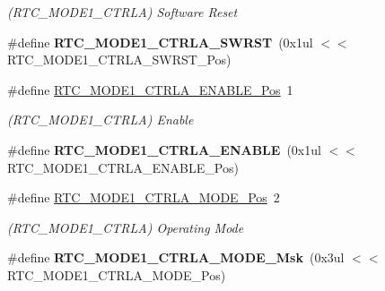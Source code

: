 \begin{DoxyCompactItemize}
\begin{DoxyCompactList}\small\item\em (R\+T\+C\+\_\+\+M\+O\+D\+E1\+\_\+\+C\+T\+R\+L\+A) Software Reset \end{DoxyCompactList}\item 
\hypertarget{group___s_a_m_l21___r_t_c_gaca206484e5f9a1691a4ce95b6c845637}{}\#define {\bfseries R\+T\+C\+\_\+\+M\+O\+D\+E1\+\_\+\+C\+T\+R\+L\+A\+\_\+\+S\+W\+R\+S\+T}~(0x1ul $<$$<$ R\+T\+C\+\_\+\+M\+O\+D\+E1\+\_\+\+C\+T\+R\+L\+A\+\_\+\+S\+W\+R\+S\+T\+\_\+\+Pos)\label{group___s_a_m_l21___r_t_c_gaca206484e5f9a1691a4ce95b6c845637}

\item 
\hypertarget{group___s_a_m_l21___r_t_c_ga93ed832f2b29bae0083eaed5b032584d}{}\#define \hyperlink{group___s_a_m_l21___r_t_c_ga93ed832f2b29bae0083eaed5b032584d}{R\+T\+C\+\_\+\+M\+O\+D\+E1\+\_\+\+C\+T\+R\+L\+A\+\_\+\+E\+N\+A\+B\+L\+E\+\_\+\+Pos}~1\label{group___s_a_m_l21___r_t_c_ga93ed832f2b29bae0083eaed5b032584d}

\begin{DoxyCompactList}\small\item\em (R\+T\+C\+\_\+\+M\+O\+D\+E1\+\_\+\+C\+T\+R\+L\+A) Enable \end{DoxyCompactList}\item 
\hypertarget{group___s_a_m_l21___r_t_c_ga5744a9f0648cc6543dafa7e397603e01}{}\#define {\bfseries R\+T\+C\+\_\+\+M\+O\+D\+E1\+\_\+\+C\+T\+R\+L\+A\+\_\+\+E\+N\+A\+B\+L\+E}~(0x1ul $<$$<$ R\+T\+C\+\_\+\+M\+O\+D\+E1\+\_\+\+C\+T\+R\+L\+A\+\_\+\+E\+N\+A\+B\+L\+E\+\_\+\+Pos)\label{group___s_a_m_l21___r_t_c_ga5744a9f0648cc6543dafa7e397603e01}

\item 
\hypertarget{group___s_a_m_l21___r_t_c_ga486afe45119b2d94182c02820cb6f4a7}{}\#define \hyperlink{group___s_a_m_l21___r_t_c_ga486afe45119b2d94182c02820cb6f4a7}{R\+T\+C\+\_\+\+M\+O\+D\+E1\+\_\+\+C\+T\+R\+L\+A\+\_\+\+M\+O\+D\+E\+\_\+\+Pos}~2\label{group___s_a_m_l21___r_t_c_ga486afe45119b2d94182c02820cb6f4a7}

\begin{DoxyCompactList}\small\item\em (R\+T\+C\+\_\+\+M\+O\+D\+E1\+\_\+\+C\+T\+R\+L\+A) Operating Mode \end{DoxyCompactList}\item 
\hypertarget{group___s_a_m_l21___r_t_c_ga29482a0d4188da43666c99a9c69145c7}{}\#define {\bfseries R\+T\+C\+\_\+\+M\+O\+D\+E1\+\_\+\+C\+T\+R\+L\+A\+\_\+\+M\+O\+D\+E\+\_\+\+Msk}~(0x3ul $<$$<$ R\+T\+C\+\_\+\+M\+O\+D\+E1\+\_\+\+C\+T\+R\+L\+A\+\_\+\+M\+O\+D\+E\+\_\+\+Pos)\label{group___s_a_m_l21___r_t_c_ga29482a0d4188da43666c99a9c69145c7}


\end{DoxyCompactItemize}
